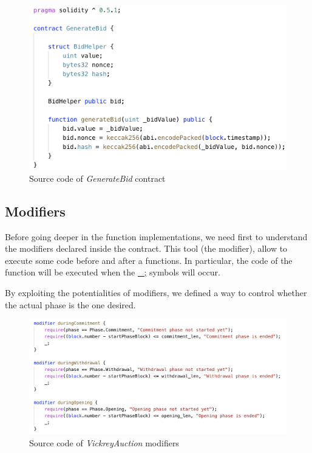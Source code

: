 \documentclass[runningheads,a4paper]{llncs}
\begin{document}
\begin{figure}[h]
\includegraphics[width=0.7\linewidth]{images/generateBid.png}
\centering
\caption{Source code of \emph{GenerateBid} contract}
\label{fig:GenerateBid}
\end{figure}




\newpage
\subsection{Modifiers}
Before going deeper in the function implementations, we need first to understand the modifiers declared inside the contract. This tool (the modifier), allow to execute some code before and after a functions. In particular, the code of the function will be executed when the \url{_;} symbols will occur.

By exploiting the potentialities of modifiers, we defined a way to control whether the actual phase is the one desired.


\begin{figure}[h]
\includegraphics[width=\linewidth]{images/vickreyModifier.png}
\centering
\caption{Source code of \emph{VickreyAuction} modifiers}
\label{fig:vickreyModifiers}
\end{figure}
\end{document}
